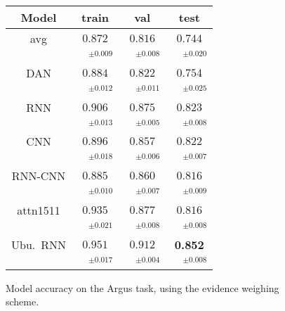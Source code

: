 \documentclass[11pt]{article}
\begin{document}
\begin{figure}[t]
\centering
\setlength{\tabcolsep}{3pt}
\begin{tabular}{|c|c|c|c|}
\hline
Model              & train & val & test \\
\hline
avg & $0.872$ & $0.816$ & $0.744$\\
 & $\quad^{\pm0.009}$ & $\quad^{\pm0.008}$ & $\quad^{\pm0.020}$\\
DAN & $0.884$ & $0.822$ & $0.754$\\
 & $\quad^{\pm0.012}$ & $\quad^{\pm0.011}$ & $\quad^{\pm0.025}$\\
\hline
RNN & $0.906$ & $0.875$ & $0.823$\\
 & $\quad^{\pm0.013}$ & $\quad^{\pm0.005}$ & $\quad^{\pm0.008}$\\
CNN & $0.896$ & $0.857$ & $0.822$\\
 & $\quad^{\pm0.018}$ & $\quad^{\pm0.006}$ & $\quad^{\pm0.007}$\\
RNN-CNN & $0.885$ & $0.860$ & $0.816$\\
 & $\quad^{\pm0.010}$ & $\quad^{\pm0.007}$ & $\quad^{\pm0.009}$\\
attn1511 & $0.935$ & $0.877$ & $0.816$\\
 & $\quad^{\pm0.021}$ & $\quad^{\pm0.008}$ & $\quad^{\pm0.008}$\\
Ubu.\ RNN & $0.951$ & $0.912$ & \textbf{0.852}\\
 & $\quad^{\pm0.017}$ & $\quad^{\pm0.004}$ & $\quad^{\pm0.008}$\\
\hline
\end{tabular}
\setlength{\tabcolsep}{6pt}
\vspace*{-0.2cm}
\caption{\footnotesize%
	Model accuracy on the Argus task, using the evidence weighing scheme.
}
\label{tab:argus}
\end{figure}
\end{document}

